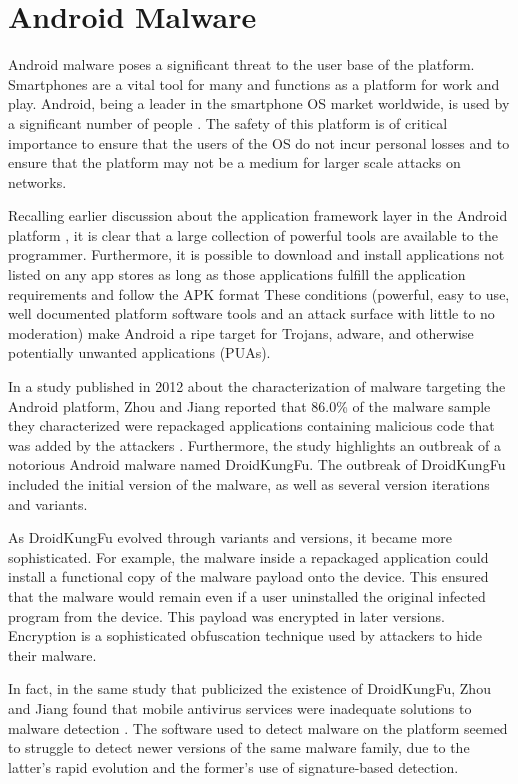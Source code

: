 \section{Android Malware}
Android malware poses a significant threat to the user base of the platform.
Smartphones are a vital tool for many and functions as a platform for work and play.
Android, being a leader in the smartphone OS market worldwide, is used by a significant number of people \cite{AndroidMarketShare2021}.
The safety of this platform is of critical importance to ensure that the users of the OS do not incur personal losses and to ensure that the platform may not be a medium for larger scale attacks on networks.

Recalling earlier discussion about the application framework layer in the Android platform \cite{AndroidDocs2022Arch}, it is clear that a large collection of powerful tools are available to the programmer.
Furthermore, it is possible to download and install applications not listed on any app stores as long as those applications fulfill the application requirements and follow the APK format \cite{AndroidDocs2022Fundamentals}
These conditions (powerful, easy to use, well documented platform software tools and an attack surface with little to no moderation) make Android a ripe target for Trojans, adware, and otherwise potentially unwanted applications (PUAs).

In a study published in 2012 about the characterization of malware targeting the Android platform, Zhou and Jiang reported that 86.0\% of the malware sample they characterized were repackaged applications containing malicious code that was added by the attackers \cite{Zhou2012}.
Furthermore, the study highlights an outbreak of a notorious Android malware named DroidKungFu.
The outbreak of DroidKungFu included the initial version of the malware, as well as several version iterations and variants.

As DroidKungFu evolved through variants and versions, it became more sophisticated.
For example, the malware inside a repackaged application could install a functional copy of the malware payload onto the device.
This ensured that the malware would remain even if a user uninstalled the original infected program from the device.
This payload was encrypted in later versions.
Encryption is a sophisticated obfuscation technique used by attackers to hide their malware.

In fact, in the same study that publicized the existence of DroidKungFu, Zhou and Jiang found that mobile antivirus services were inadequate solutions to malware detection \cite{Zhou2012}.
The software used to detect malware on the platform seemed to struggle to detect newer versions of the same malware family, due to the latter's rapid evolution and the former's use of signature-based detection.

